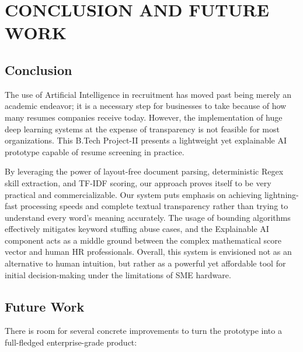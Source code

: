 \chapter{CONCLUSION AND FUTURE WORK}

\section{Conclusion}
The use of Artificial Intelligence in recruitment has moved past being merely an academic endeavor; it is a necessary step for businesses to take because of how many resumes companies receive today. However, the implementation of huge deep learning systems at the expense of transparency is not feasible for most organizations. This B.Tech Project-II presents a lightweight yet explainable AI prototype capable of resume screening in practice.

By leveraging the power of layout-free document parsing, deterministic Regex skill extraction, and TF-IDF scoring, our approach proves itself to be very practical and commercializable. Our system puts emphasis on achieving lightning-fast processing speeds and complete textual transparency rather than trying to understand every word's meaning accurately. The usage of bounding algorithms effectively mitigates keyword stuffing abuse cases, and the Explainable AI component acts as a middle ground between the complex mathematical score vector and human HR professionals. Overall, this system is envisioned not as an alternative to human intuition, but rather as a powerful yet affordable tool for initial decision-making under the limitations of SME hardware.


\section{Future Work}
There is room for several concrete improvements to turn the prototype into a full-fledged enterprise-grade product:

